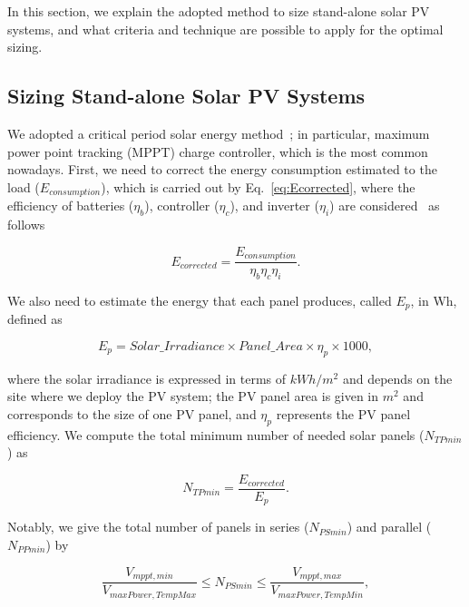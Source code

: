 \documentclass[journal]{IEEEtran}
\begin{document}
In this section, we explain the adopted method to size stand-alone solar PV systems, and what criteria and technique are possible to apply for the optimal sizing. 

\subsection{Sizing Stand-alone Solar PV Systems}
\label{sec:sizing}

We adopted a critical period solar energy method~\cite{Pinho}; in particular, maximum power point tracking (MPPT) charge controller, which is the most common nowadays. First, we need to correct the energy consumption estimated to the load ($E_{consumption}$), which is carried out by Eq.~\eqref{eq:Ecorrected}, where the efficiency of batteries ($\eta_{b}$), controller ($\eta_{c}$), and inverter ($\eta_{i}$) are considered~\cite{Pinho} as follows

\begin{equation}
\label{eq:Ecorrected}
E_{corrected} = \dfrac{E_{consumption}}{\eta_{b} \eta_{c} \eta_{i} }.
\end{equation}

We also need to estimate the energy that each panel produces, called $E_{p}$, in Wh, defined as

\begin{equation}
\label{eq:Ep}
E_{p} = Solar\_Irradiance \times Panel\_Area \times \eta_{p} \times 1000,
\end{equation}

\noindent where the solar irradiance is expressed in terms of $kWh/m^{2}$ and depends on the site where we deploy the PV system; 
the PV panel area is given in $m^{2}$ and corresponds to the size of one PV panel, and $\eta_{p}$ represents the PV panel efficiency.
We compute the total minimum number of needed solar panels ($N_{TPmin}$) as

\begin{equation}
\label{eq:NTPmin}
N_{TPmin} = \dfrac{E_{corrected}}{E_{p}}.
\end{equation}

Notably, we give the total number of panels in series ($N_{PSmin}$) and parallel ($N_{PPmin}$) by

\begin{equation}
\label{eq:NPSmin}
\dfrac{V_{mppt,min}}{V_{maxPower,TempMax}} \leq N_{PSmin} \leq \dfrac{V_{mppt,max}}{V_{maxPower,TempMin}},
\end{equation}
\end{document}
